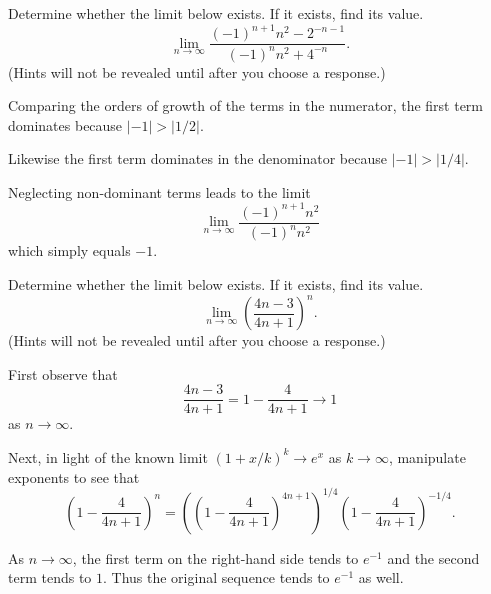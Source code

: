 \documentclass{ximera}
\begin{document}
\begin{question}%

Determine whether the limit below exists. If it exists, find its value.
\[\lim_{n \rightarrow \infty} \frac{(-1)^{n+1}n^2 - 2^{-n-1}}{(-1)^{n}n^2 + 4^{-n}}.\] 
(Hints will not be revealed until after you choose a response.)
\begin{multiplechoice}
\end{multiplechoice}
\begin{feedback}
Comparing the orders of growth of the terms in the numerator, the first term dominates because \(|-1|>|1/2|\). 
\begin{hint} Likewise the first term dominates in the denominator because  \(|-1|>|1/4|\). \begin{hint} Neglecting non-dominant terms leads to the limit \[\lim_{n \rightarrow \infty} \frac{(-1)^{n+1}n^2}{(-1)^{n}n^2}\] which simply equals \(-1\). \end{hint} \end{hint}
\end{feedback}

\end{question}

\begin{question}%

Determine whether the limit below exists. If it exists, find its value.
\[\lim_{n \rightarrow \infty} \left(\frac{4n - 3}{4n + 1}\right)^{n}.\] 
(Hints will not be revealed until after you choose a response.)
\begin{multiplechoice}
\end{multiplechoice}
\begin{feedback}
First observe that 
\[\frac{4n - 3}{4n + 1} = 1 - \frac{4}{4n + 1} \rightarrow 1\]
as \(n \rightarrow \infty\). \begin{hint} Next, in light of the known limit \((1+x/k)^{k} \rightarrow e^x\) as \(k \rightarrow \infty\), manipulate exponents to see that  \[\left(1 - \frac{4}{4n + 1}\right)^n = \left( \left(1 - \frac{4}{4n + 1}\right)^{4n + 1} \right)^{ 1/4} \left(1 - \frac{4}{4n + 1}\right)^{-1/4}. \] \begin{hint} As \(n \rightarrow \infty\), the first term on the right-hand side tends to \(e^{-1}\) and the second term tends to \(1\). Thus the original sequence tends to \(e^{-1}\) as well. \end{hint} \end{hint}
\end{feedback}

\end{question}
\end{document}

